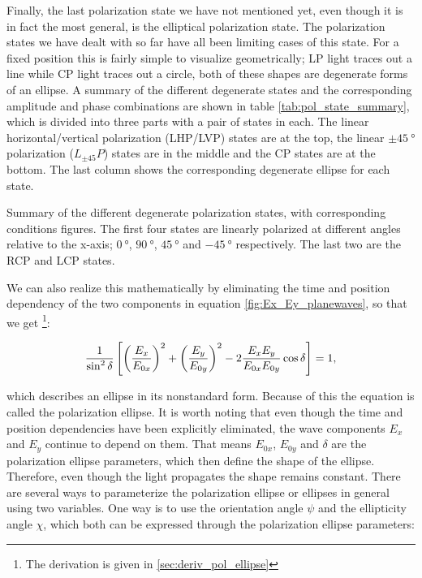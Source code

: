 Finally, the last polarization state we have not mentioned yet, even though it is in fact the most general, is the elliptical polarization state. The polarization states we have dealt with so far have all been limiting cases of this state. For a fixed position this is fairly simple to visualize geometrically; LP light traces out a line while CP light traces out a circle, both of these shapes are degenerate forms of an ellipse. A summary of the different degenerate states and the corresponding amplitude and phase combinations are shown in table \ref{tab:pol_state_summary}, which is divided into three parts with a pair of states in each. The linear horizontal/vertical polarization (LHP/LVP) states are at the top, the linear $\pm\SI{45}{\degree}$ polarization ($L_{\pm45}P$) states are in the middle and the CP states are at the bottom. The last column shows the corresponding degenerate ellipse for each state.

\begin{table}[h]
    \centering
    
    \caption{Summary of the different degenerate polarization states, with corresponding conditions figures. The first four states are linearly polarized at different angles relative to the x-axis; $\SI{0}{\degree}$, $\SI{90}{\degree}$, $\SI{45}{\degree}$ and $\SI{-45}{\degree}$ respectively. The last two are the RCP and LCP states.}
    \label{tab:pol_state_summary}
\end{table}

We can also realize this mathematically by eliminating the time and position dependency of the two components in equation \ref{fig:Ex_Ey_planewaves}, so that we get \footnote{The derivation is given in \ref{sec:deriv_pol_ellipse}}:

\begin{equation}
    \centering
    \label{eq:pol_ellipse}
    \frac{1}{\sin^2 \delta} \left[ \left(\frac{E_x}{E_{0x}}\right)^2+\left(\frac{E_y}{E_{0y}}\right)^2-2\frac{E_x E_y}{E_{0x} E_{0y}}\cos \delta \right]=1,
\end{equation}

which describes an ellipse in its nonstandard form. Because of this the equation is called the polarization ellipse. It is worth noting that even though the time and position dependencies have been explicitly eliminated, the wave components $E_x$ and $E_y$ continue to depend on them. That means $E_{0x}$, $E_{0y}$ and $\delta$ are the polarization ellipse parameters, which then define the shape of the ellipse. Therefore, even though the light propagates the shape remains constant. There are several ways to parameterize the polarization ellipse or ellipses in general using two variables. One way is to use the orientation angle $\psi$ and the ellipticity angle $\chi$, which both can be expressed through the polarization ellipse parameters: 

